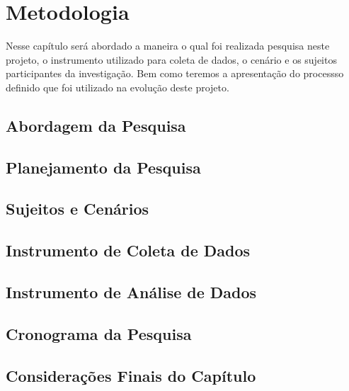 \chapter[Metodologia]{Metodologia}

    Nesse capítulo será abordado a maneira o qual foi realizada pesquisa neste projeto,
    o instrumento utilizado para coleta de dados, o cenário e os sujeitos participantes da
    investigação. Bem como teremos a apresentação do processso definido que foi utilizado
    na evolução deste projeto.

    \section{Abordagem da Pesquisa}

    \section{Planejamento da Pesquisa}

    \section{Sujeitos e Cenários}

    \section{Instrumento de Coleta de Dados}

    \section{Instrumento de Análise de Dados}

    \section{Cronograma da Pesquisa}

    \section{Considerações Finais do Capítulo}
